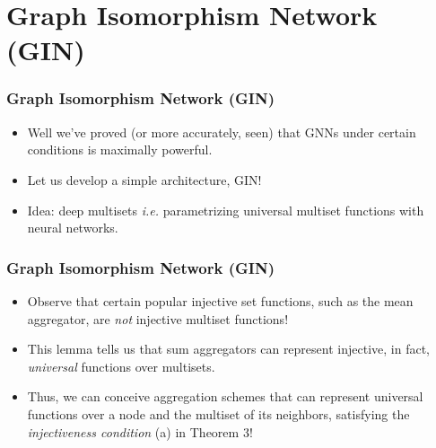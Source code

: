 \documentclass{beamer}
\begin{document}

\section{Graph Isomorphism Network (GIN)}

\begin{frame}
\frametitle{Graph Isomorphism Network (GIN)}

\begin{itemize}
	\item Well we've proved (or more accurately, seen) that GNNs under certain conditions is maximally powerful. \pause
	
	\item Let us develop a simple architecture, GIN! \pause
	
	\item Idea: \alert{deep multisets} {\it i.e.} parametrizing universal multiset functions with neural networks.

\end{itemize}


\end{frame}

\begin{frame}
\frametitle{Graph Isomorphism Network (GIN)}

\begin{itemize}
\begin{block}{Lemma 5}
Assume $\mathcal{X}$ is countable.
There exists a function $f : \mathcal{X} \rightarrow \mathbb{R}^n$ so that $h(X) = \sum_{x \in X} f(x)$ is unique for each multiset $X \subset \mathcal{X}$ of bounded size.

Moreover, any multiset function $g$ can be decomposed as $g(X) = \phi \left( \sum_{x \in X} f(x) \right)$ for some function $\phi$.
\end{block} \pause

	\item Observe that certain popular injective set functions, such as the mean aggregator, are {\it not} injective multiset functions! \pause
	
	\item This lemma tells us that sum aggregators can represent injective, in fact, {\it universal} functions over multisets. \pause
	
	\item Thus, we can conceive aggregation schemes that can \alert{represent universal functions over a node and the multiset of its neighbors}, satisfying the {\it injectiveness condition} (a) in Theorem 3!

\end{itemize}


\end{frame}
\end{document}

